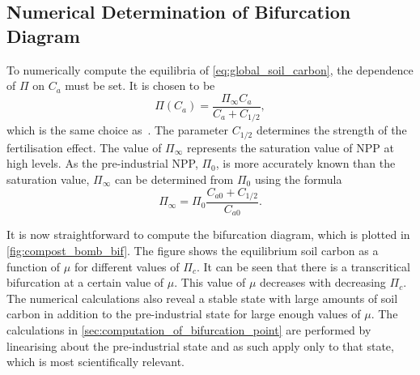 \subsection{Numerical Determination of Bifurcation Diagram}

To numerically compute the equilibria of \cref{eq:global_soil_carbon}, the dependence of $\Pi$ on
$C_a$  must be set. It is chosen to be
\begin{equation}
  \label{eq:npp_fertilization}
  \Pi(C_a) = \frac{\Pi_{\infty} C_a}{C_a + C_{1/2}},
\end{equation}
which is the same choice as~\cite{Cox2006}. The parameter $C_{1/2}$ determines the strength of the  fertilisation effect. The value of $\Pi_{\infty}$
represents the saturation value of NPP at high  levels. As the pre-industrial NPP, $\Pi_0$, is more accurately known than the saturation value,
$\Pi_{\infty}$  can be determined from $\Pi_0$ using
the formula
\begin{equation}
  \label{eq:npp_saturation_from_pi}
  \Pi_{\infty} = \Pi_0 \frac{C_{a0} + C_{1/2}}{C_{a0}}.
\end{equation}


It is now straightforward to compute the bifurcation diagram, which is plotted in \cref{fig:compost_bomb_bif}. The figure shows the equilibrium soil carbon as a function
of $\mu$ for different values of $\Pi_c$. It can be seen that there is a transcritical bifurcation at a certain value of $\mu$. This value of $\mu$ decreases with decreasing $\Pi_c$.
The numerical calculations also reveal a stable state with large amounts of soil carbon in addition to the pre-industrial state for large enough values of $\mu$. The calculations in
\cref{sec:computation_of_bifurcation_point} are performed by linearising about the pre-industrial state and as such apply only to that state, which is most scientifically relevant.


